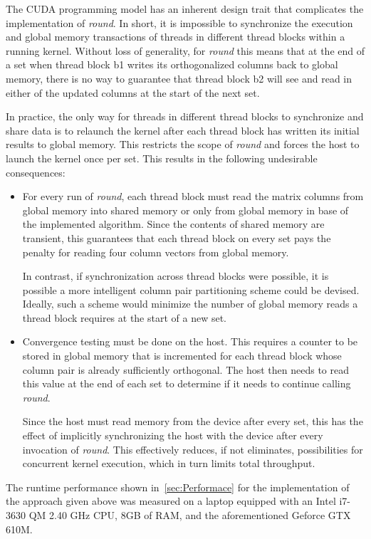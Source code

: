 The CUDA programming model has an inherent design trait that complicates the implementation of \textit{round}. In short, it is impossible to synchronize the execution and global memory transactions of threads in different thread blocks within a running kernel. Without loss of generality, for \textit{round} this means that at the end of a set when thread block b1 writes its orthogonalized columns back to global memory, there is no way to guarantee that thread block b2 will see and read in either of the updated columns at the start of the next set.

In practice, the only way for threads in different thread blocks to synchronize and share data is to relaunch the kernel after each thread block has written its initial results to global memory. This restricts the scope of \textit{round} and forces the host to launch the kernel once per set. This results in the following undesirable consequences:
\begin{itemize}
	\item For every run of \textit{round}, each thread block must read the matrix columns from global	memory into shared memory or only from global memory in base of the implemented algorithm. Since the contents of shared memory are transient, this guarantees that each thread block on every set pays the penalty for reading four column vectors from global memory.
	
	In contrast, if synchronization across thread blocks were possible, it is possible a more intelligent column pair partitioning scheme could be devised. Ideally, such a scheme would minimize the number of global	memory reads a thread block requires at the start of a new set.
	\item Convergence testing must be done on the host. This requires a counter to be stored in global memory that is incremented for each thread block whose column pair is already sufficiently orthogonal. The host then needs to read this value at the end of each set to determine if it needs to continue calling \textit{round}. 
	
	Since the host must read memory from the device after every set, this has the effect of implicitly synchronizing the host with the device after every invocation of \textit{round}. This effectively reduces, if not eliminates,	possibilities for concurrent kernel execution, which in turn limits total throughput.
\end{itemize}

The runtime performance shown in~\ref{sec:Performace} for the implementation of the approach given above was measured on a laptop equipped with an Intel i7-3630 QM 2.40 GHz CPU, 8GB of RAM, and the aforementioned Geforce GTX 610M.

